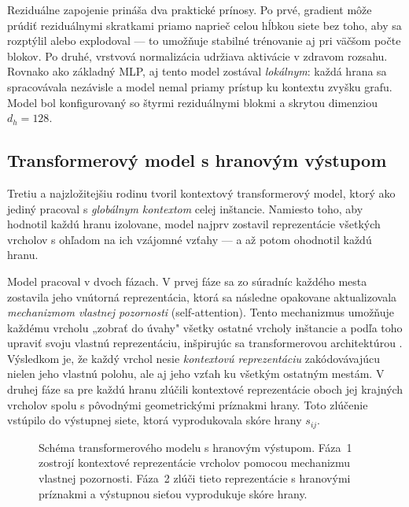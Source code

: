 \indent Reziduálne zapojenie prináša dva praktické prínosy. Po prvé,
gradient môže prúdiť reziduálnymi skratkami priamo naprieč celou
hĺbkou siete bez toho, aby sa rozptýlil alebo explodoval — to umožňuje
stabilné trénovanie aj pri väčšom počte blokov. Po druhé, vrstvová
normalizácia udržiava aktivácie v zdravom rozsahu. Rovnako ako základný
MLP, aj tento model zostával \emph{lokálnym}: každá hrana sa
spracovávala nezávisle a model nemal priamy prístup ku kontextu zvyšku
grafu. Model bol konfigurovaný so štyrmi reziduálnymi blokmi
a skrytou dimenziou \(d_h = 128\).

\subsection{Transformerový model s hranovým výstupom}
\label{sec:edge_transformer}

\indent Tretiu a najzložitejšiu rodinu tvoril kontextový transformerový
model, ktorý ako jediný pracoval s \emph{globálnym kontextom} celej
inštancie. Namiesto toho, aby hodnotil každú hranu izolovane, model
najprv zostavil reprezentácie všetkých vrcholov s ohľadom na ich
vzájomné vzťahy — a až potom ohodnotil každú hranu.

\indent Model pracoval v dvoch fázach. V prvej fáze sa zo súradníc
každého mesta zostavila jeho vnútorná reprezentácia, ktorá sa následne
opakovane aktualizovala \emph{mechanizmom vlastnej pozornosti}
(self-attention). Tento mechanizmus umožňuje každému vrcholu
„zobrať do úvahy" všetky ostatné vrcholy inštancie a podľa toho
upraviť svoju vlastnú reprezentáciu, inšpirujúc sa transformerovou
architektúrou \parencite{vaswani2017attention}.
Výsledkom je, že každý vrchol nesie \emph{kontextovú reprezentáciu}
zakódovávajúcu nielen jeho vlastnú polohu, ale aj jeho vzťah
ku všetkým ostatným mestám. V druhej fáze sa pre každú hranu zlúčili
kontextové reprezentácie oboch jej krajných vrcholov spolu
s pôvodnými geometrickými príznakmi hrany. Toto zlúčenie vstúpilo
do výstupnej siete, ktorá vyprodukovala skóre hrany \(s_{ij}\).

\begin{figure}[H]
    \centering
    \resizebox{0.95\textwidth}{!}{}
    \caption{Schéma transformerového modelu s hranovým výstupom.
             Fáza~1 zostrojí kontextové reprezentácie vrcholov
             pomocou mechanizmu vlastnej pozornosti.
             Fáza~2 zlúči tieto reprezentácie s hranovými príznakmi
             a výstupnou sieťou vyprodukuje skóre hrany.}
    \label{fig:transformer_diagram}
\end{figure}

